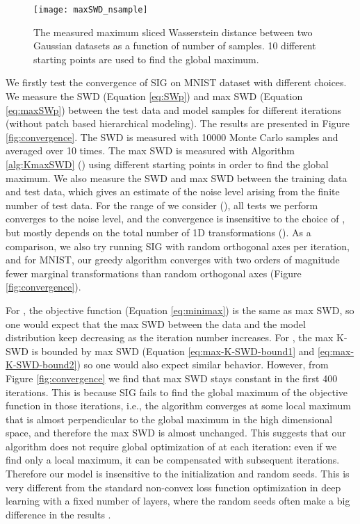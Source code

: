 \documentclass{article}
\begin{document}
\begin{figure}[htb]
     \centering
     \texttt{[image: maxSWD\_nsample]}
     \caption{The measured maximum sliced Wasserstein distance between two Gaussian datasets as a function of number of samples. 10 different starting points are used to find the global maximum.}
    \label{fig:maxSWD_nsample}
    \vskip -0.10in
\end{figure}

We firstly test the convergence of SIG on MNIST dataset with different  choices. We measure the SWD (Equation \ref{eq:SWp}) and max SWD (Equation \ref{eq:maxSWp}) between the test data and model samples for different iterations (without patch based hierarchical modeling). The results are presented in Figure \ref{fig:convergence}. The SWD is measured with 10000 Monte Carlo samples and averaged over 10 times. The max SWD is measured with Algorithm \ref{alg:KmaxSWD} () using different starting points in order to find the global maximum. We also measure the SWD and max SWD between the training data and test data, which gives an estimate of the noise level arising from the finite number of test data. For the range of  we consider (), all tests we perform converges to the noise level, and the convergence is insensitive to the choice of , but mostly depends on the total number of 1D transformations (). As a comparison, we also try running SIG with random orthogonal axes per iteration, and for MNIST, our greedy algorithm converges with two orders of magnitude fewer marginal transformations than random orthogonal axes (Figure \ref{fig:convergence}).

For , the objective function (Equation \ref{eq:minimax}) is the same as max SWD, so one would expect that the max SWD between the data and the model distribution keep decreasing as the iteration number increases. For , the max K-SWD is bounded by max SWD (Equation \ref{eq:max-K-SWD-bound1} and \ref{eq:max-K-SWD-bound2}) so one would also expect similar behavior. However, from Figure \ref{fig:convergence} we find that max SWD stays constant in the first 400 iterations. This is because SIG fails to find the global maximum of the objective function in those iterations, i.e., the algorithm converges at some local maximum that is almost perpendicular to the global maximum in the high dimensional space, and therefore the max SWD is almost unchanged. This suggests that our algorithm does not require global optimization of  at each iteration: even if we find only a local maximum, it can be compensated with subsequent iterations. Therefore our model is insensitive to the initialization and random seeds. This is very different from the standard non-convex loss function optimization in deep learning with a fixed number of layers, where the random seeds often make a big difference in the results \citep{lucic2018gans}.
\end{document}
